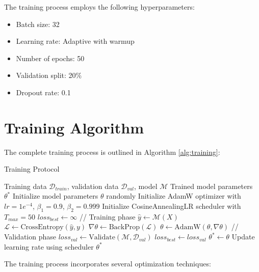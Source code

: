 \documentclass[12pt,a4paper]{article}
\begin{document}
The training process employs the following hyperparameters:
\begin{itemize}
    \item Batch size: 32
    \item Learning rate: Adaptive with warmup
    \item Number of epochs: 50
    \item Validation split: 20\%
    \item Dropout rate: 0.1
\end{itemize}

\section{Training Algorithm}
The complete training process is outlined in Algorithm \ref{alg:training}:

\begin{algorithm}[H]
\caption{Training Protocol}
\label{alg:training}
\begin{algorithmic}[1]
\Require Training data $\mathcal{D}_{train}$, validation data $\mathcal{D}_{val}$, model $\mathcal{M}$
\Ensure Trained model parameters $\theta^*$
\State Initialize model parameters $\theta$ randomly
\State Initialize AdamW optimizer with $lr=1e^{-4}$, $\beta_1=0.9$, $\beta_2=0.999$
\State Initialize CosineAnnealingLR scheduler with $T_{max}=50$
\State $loss_{best} \gets \infty$
    \State // Training phase
        \State $\hat{y} \gets \mathcal{M}(X)$ 
        \State $\mathcal{L} \gets \text{CrossEntropy}(\hat{y}, y)$ 
        \State $\nabla \theta \gets \text{BackProp}(\mathcal{L})$ 
        \State $\theta \gets \text{AdamW}(\theta, \nabla \theta)$ 
    \EndFor
    \State // Validation phase
    \State $loss_{val} \gets \text{Validate}(\mathcal{M}, \mathcal{D}_{val})$
        \State $loss_{best} \gets loss_{val}$
        \State $\theta^* \gets \theta$ 
    \EndIf
    \State Update learning rate using scheduler
\EndFor
\State \Return $\theta^*$
\end{algorithmic}
\end{algorithm}

The training process incorporates several optimization techniques:
\end{document}

